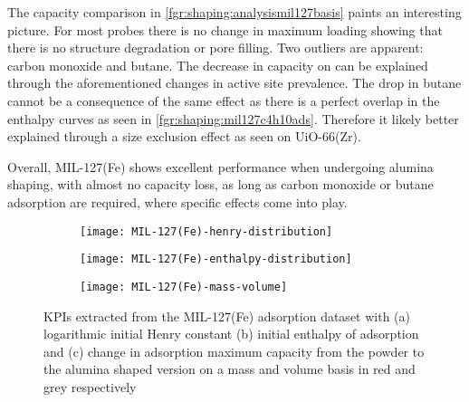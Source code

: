 The capacity comparison in \autoref{fgr:shaping:analysismil127basis}
paints an interesting picture. For most probes there is no change in
maximum loading showing that there is no structure degradation or
pore filling. Two outliers are apparent: carbon monoxide and
butane. The decrease in capacity on  can be explained through the
aforementioned changes in active site prevalence.
The drop in butane cannot be a consequence of the same effect
as there is a perfect overlap in the enthalpy curves as seen in
\autoref{fgr:shaping:mil127c4h10ads}.
Therefore it likely better explained through a size exclusion
effect as seen on UiO-66(Zr).

Overall, MIL-127(Fe) shows excellent performance when undergoing
alumina shaping, with almost no capacity loss, as long as
carbon monoxide or butane adsorption are required, where specific effects
come into play.

\begin{figure}[p!]
	\centering
	\begin{subfigure}{\linewidth}
		\parbox[c]{0.1\linewidth}{\caption{}%
			\label{fgr:shaping:analysismil127henry}}%
		\parbox[b]{0.8\linewidth}{%
			\texttt{[image: MIL-127(Fe)-henry-distribution]}%
		}%
	\end{subfigure}

	\begin{subfigure}{\linewidth}
		\parbox[c]{0.1\linewidth}{\caption{}%
			\label{fgr:shaping:analysismil127enth}}%
		\parbox[b]{0.8\linewidth}{%
			\texttt{[image: MIL-127(Fe)-enthalpy-distribution]}%
		}%
	\end{subfigure}

	\begin{subfigure}{\linewidth}
		\parbox[c]{0.1\linewidth}{\caption{}%
			\label{fgr:shaping:analysismil127basis}}%
		\parbox[b]{0.8\linewidth}{%
			\texttt{[image: MIL-127(Fe)-mass-volume]}%
		}%
	\end{subfigure}

	\caption{KPIs extracted from the MIL-127(Fe) adsorption dataset with
		(a) logarithmic initial Henry constant (b) initial enthalpy of
        adsorption and (c) change in adsorption maximum capacity from 
        the powder to the alumina shaped version on a mass and volume 
        basis in red and grey respectively}%
	\label{fgr:shaping:analysismil127}
\end{figure}